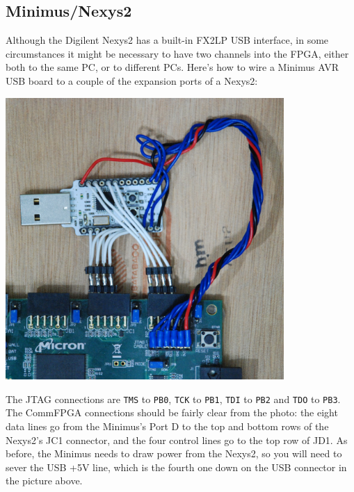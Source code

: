\subsection{Minimus/Nexys2}
Although the Digilent Nexys2 has a built-in FX2LP USB interface, in some circumstances it might be necessary to have two channels into the FPGA, either both to the same PC, or to different PCs. Here's how to wire a Minimus AVR USB board to a couple of the expansion ports of a Nexys2:

\vspace*{0.5cm}
\centerline{\includegraphics[width=300pt]{images/nexys2}}

The JTAG connections are \texttt{TMS} to \texttt{PB0}, \texttt{TCK} to \texttt{PB1}, \texttt{TDI} to \texttt{PB2} and \texttt{TDO} to \texttt{PB3}. The CommFPGA connections should be fairly clear from the photo: the eight data lines go from the Minimus's Port D to the top and bottom rows of the Nexys2's JC1 connector, and the four control lines go to the top row of JD1. As before, the Minimus needs to draw power from the Nexys2, so you will need to sever the USB +5V line, which is the fourth one down on the USB connector in the picture above.


